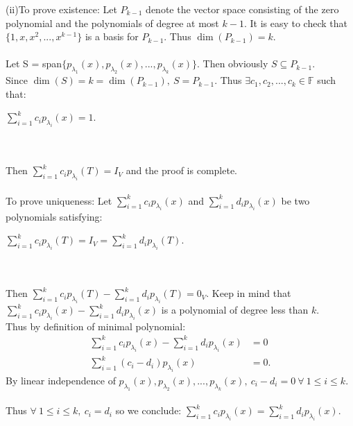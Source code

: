 \documentclass{article}
\begin{document}
(ii)To prove existence: Let $P_{k-1}$ denote the vector space consisting of the zero polynomial and the polynomials of degree at most $k-1.$ It is easy to check that $\{1,x,x^2,...,x^{k-1}\}$ is a basis for $P_{k-1}$. Thus $\dim(P_{k-1}) = k.$\\\\
Let S = span$\{p_{\lambda_1}(x),p_{\lambda_2}(x),...,p_{\lambda_k}(x)\}.$ Then obviously $S \subseteq P_{k-1}.$\\ Since $\dim(S) = k = \dim(P_{k-1}),\ S = P_{k-1}$. Thus $\exists c_1,c_2,...,c_k \in \mathbb{F}$ such that:\begin{center}
$\sum^k_{i=1}c_ip_{\lambda_i}(x) = 1$.\end{center}\\\\
Then $\sum^k_{i=1}c_ip_{\lambda_i}(T) = I_V$ and the proof is complete.\\\\
To prove uniqueness: Let $\sum^k_{i=1}c_ip_{\lambda_i}(x)$ and $\sum^k_{i=1}d_ip_{\lambda_i}(x)$ be two polynomials satisfying:\begin{center}
    $\sum^k_{i=1}c_ip_{\lambda_i}(T) = I_V = \sum^k_{i=1}d_ip_{\lambda_i}(T).$
\end{center}\\\\
Then $\sum^k_{i=1}c_ip_{\lambda_i}(T)-\sum^k_{i=1}d_ip_{\lambda_i}(T) = 0_V$. Keep in mind that\\ $\sum^k_{i=1}c_ip_{\lambda_i}(x)-\sum^k_{i=1}d_ip_{\lambda_i}(x)$ is a polynomial of degree less than $k$.\\ Thus by definition of minimal polynomial:\begin{align*}
\sum^k_{i=1}c_ip_{\lambda_i}(x)-\sum^k_{i=1}d_ip_{\lambda_i}(x) &= 0\\
\sum^k_{i=1}(c_i-d_i)p_{\lambda_i}(x)&=0.
\end{align*} 
By linear independence of $p_{\lambda_1}(x),p_{\lambda_2}(x),...,p_{\lambda_k}(x),\ c_i - d_i = 0 \ \forall \ 1\leq i\leq k$.\\\\
Thus $\forall \ 1\leq i \leq k,\ c_i = d_i$ so we conclude: $\sum^k_{i=1}c_ip_{\lambda_i}(x)=\sum^k_{i=1}d_ip_{\lambda_i}(x).$
\end{document}
